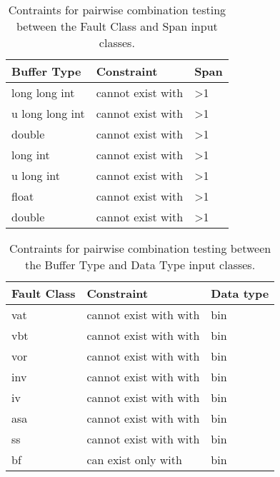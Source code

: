 

\begin{table}[ht]

  \scriptsize
  \centering
  \caption{Contraints for pairwise combination testing between the Fault Class and Span input classes.}
  \label{table:constraints_1_DAMA}

  \begin{tabular}{@{}lll@{}}
  \textbf{Buffer   Type} & \textbf{Constraint} & \textbf{Span}   \\ \midrule
  long long int          & cannot exist with       & \textgreater{}1 \\
  u long long int        & cannot exist with       & \textgreater{}1 \\
  double                 & cannot exist with       & \textgreater{}1 \\
  long int               & cannot exist with       & \textgreater{}1 \\
  u long int             & cannot exist with       & \textgreater{}1 \\
  float                  & cannot exist with       & \textgreater{}1 \\
  double                 & cannot exist with       & \textgreater{}1 \\ \bottomrule
  \end{tabular}

\end{table}


\begin{table}[ht]

\scriptsize
\centering
\caption{Contraints for pairwise combination testing between the Buffer Type and Data Type input classes.}
\label{table:constraints_2_DAMA}

\begin{tabular}{@{}lll@{}}
\textbf{Fault Class} & \textbf{Constraint} & \textbf{Data type} \\ \midrule
vat                  & cannot exist with with  & bin                \\
vbt                  & cannot exist with with  & bin                \\
vor                  & cannot exist with with  & bin                \\
inv                  & cannot exist with with  & bin                \\
iv                   & cannot exist with with  & bin                \\
asa                  & cannot exist with with  & bin                \\
ss                   & cannot exist with with  & bin                \\
bf                   & can exist only with & bin                \\ \bottomrule
\end{tabular}

\end{table}


